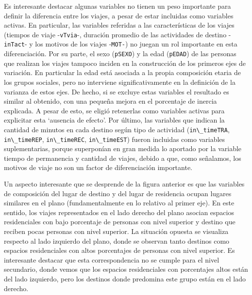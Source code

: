 \documentclass[
  spanish,
  a4paper,%
  chapterprefix=true,%
  DIV=calc,%
  twoside]{scrbook}%
\newcommand{\passthrough}[1]{#1}
\begin{document}
Es interesante destacar algunas variables no tienen un peso importante
para definir la diferencia entre los viajes, a pesar de estar incluidas
como variables activas. En particular, las variables referidas a las
características de los viajes (tiempos de viaje -\passthrough{\lstinline!vTvia!}-, duración
promedio de las actividades de destino -\passthrough{\lstinline!inTact!}- y los motivos de los
viajes -\passthrough{\lstinline!MOT-!}) no juegan un rol importante en esta diferenciación. Por
su parte, el sexo (\passthrough{\lstinline!pSEXO!}) y la edad (\passthrough{\lstinline!pEDAD!}) de las personas que
realizan los viajes tampoco inciden en la construcción de los primeros
ejes de variación. En particular la edad está asociada a la propia
composición etaria de los grupos sociales, pero no interviene
significativamente en la definición de la varianza de estos ejes. De
hecho, si se excluye estas variables el resultado es similar al
obtenido, con una pequeña mejora en el porcentaje de inercia explicada.
A pesar de esto, se eligió retenerlas como variables activas para
explicitar esta `ausencia de efecto'. Por último, las variables que
indican la cantidad de minutos en cada destino según tipo de actividad
(\passthrough{\lstinline!in\_timeTRA!}, \passthrough{\lstinline!in\_timeREP!}, \passthrough{\lstinline!in\_timeREC!}, \passthrough{\lstinline!in\_timeEST!}) fueron
incluidas como variables suplementarias, porque superponían en gran
medida lo aportado por la variable tiempo de permanencia y cantidad de
viajes, debido a que, como señalamos, los motivos de viaje no son un
factor de diferenciación importante.

Un aspecto interesante que se desprende de la figura anterior es que las
variables de composición del lugar de destino y del lugar de residencia
ocupan lugares similares en el plano (fundamentalmente en lo relativo al
primer eje). En este sentido, los viajes representados en el lado
derecho del plano asocian espacios residenciales con bajo porcentaje de
personas con nivel superior y destino que reciben pocas personas con
nivel superior. La situación opuesta se visualiza respecto al lado
izquierdo del plano, donde se observan tanto destinos como espacios
residenciales con altos porcentajes de personas con nivel superior. Es
interesante destacar que esta correspondencia no se cumple para el nivel
secundario, donde vemos que los espacios residenciales con porcentajes
altos están del lado izquierdo, pero los destinos donde predomina este
grupo están en el lado derecho.
\end{document}
